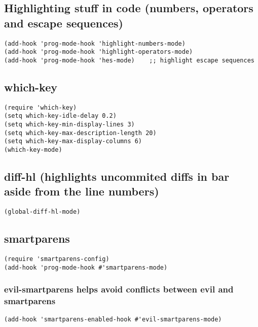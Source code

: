 \documentclass[11pt]{article}
\begin{document}
\subsection*{Highlighting stuff in code (numbers, operators and escape sequences)}
\label{sec:org1d28261}
\begin{verbatim}
(add-hook 'prog-mode-hook 'highlight-numbers-mode)
(add-hook 'prog-mode-hook 'highlight-operators-mode)
(add-hook 'prog-mode-hook 'hes-mode)    ;; highlight escape sequences
\end{verbatim}

\subsection*{which-key}
\label{sec:org2ec2d8a}

\begin{verbatim}
(require 'which-key)
(setq which-key-idle-delay 0.2)
(setq which-key-min-display-lines 3)
(setq which-key-max-description-length 20)
(setq which-key-max-display-columns 6)
(which-key-mode)
\end{verbatim}

\subsection*{diff-hl (highlights uncommited diffs in bar aside from the line numbers)}
\label{sec:org0f80897}
\begin{verbatim}
(global-diff-hl-mode)
\end{verbatim}

\subsection*{smartparens}
\label{sec:org14cce7e}

\begin{verbatim}
(require 'smartparens-config)
(add-hook 'prog-mode-hook #'smartparens-mode)
\end{verbatim}

\subsubsection*{evil-smartparens helps avoid conflicts between evil and smartparens}
\label{sec:orgd887e25}

\begin{verbatim}
(add-hook 'smartparens-enabled-hook #'evil-smartparens-mode)
\end{verbatim}
\end{document}
